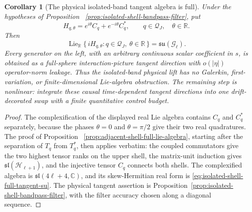 \documentclass[11pt]{article}
\newtheorem{corollary}[theorem]{Corollary}
\theoremstyle{remark}
\begin{document}
\begin{corollary}[The physical isolated-band tangent algebra is full]
\label{cor:isolated-shell-full-tangent-algebra}
Under the hypotheses of Proposition
~\ref{prop:isolated-shell-bandpass-filter}, put
\[
 H_{q,\theta}
 =e^{i\theta}C_q+e^{-i\theta}C_q^\ast,
 \qquad q\in\mathcal Q_J,\quad\theta\in\mathbb R.
\]
Then
\begin{equation}
 \operatorname{Lie}_{\mathbb R}
 \{\,iH_{q,\theta}:q\in\mathcal Q_J,\ \theta\in\mathbb R\,\}
 =\mathfrak{su}(\mathcal G_\ell).
 \label{eq:isolated-shell-full-tangent-su}
\end{equation}
Every generator on the left, with an arbitrary continuous scalar coefficient
in $s$, is obtained as a full-sphere interaction-picture tangent direction
with $o(|\eta|)$ operator-norm leakage.  Thus the isolated-band physical lift
has no Galerkin, first-variation, or finite-dimensional Lie-algebra
obstruction.  The remaining step is nonlinear: integrate these causal
time-dependent tangent directions into one drift-decorated swap with a
finite quantitative control budget.
\end{corollary}

\begin{proof}
The complexification of the displayed real Lie algebra contains $C_q$ and
$C_q^\ast$ separately, because the phases $\theta=0$ and $\theta=\pi/2$
give their two real quadratures.  The proof of Proposition
~\ref{prop:adjacent-shell-full-lie-algebra}, starting after the separation of
$T_q$ from $T_q^\ast$, then applies verbatim: the coupled commutators give
the two highest tensor ranks on the upper shell, the matrix-unit induction
gives $\mathfrak{sl}(\mathcal H_{\ell+1})$, and the injective tensor $C_q$
connects both shells.  The complexified algebra is
$\mathfrak{sl}(4\ell+4,\mathbb C)$, and its skew-Hermitian real form is
\eqref{eq:isolated-shell-full-tangent-su}.  The physical tangent assertion is
Proposition~\ref{prop:isolated-shell-bandpass-filter}, with the filter
accuracy chosen along a diagonal sequence.
\end{proof}
\end{document}
